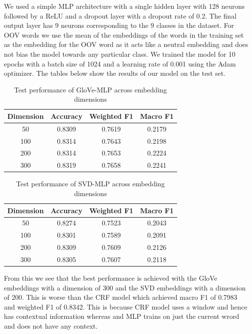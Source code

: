 \documentclass{report}
\begin{document}
We used a simple MLP architecture with a single hidden layer with 128 neurons followed by a ReLU and a dropout layer with a dropout rate of 0.2. The final output layer has 9 neurons corresponding to the 9 classes in the dataset. For OOV words we use the mean of the embeddings of the words in the training set as the embedding for the OOV word as it acts like a neutral embedding and does not bias the model towards any particular class. We trained the model for 10 epochs with a batch size of 1024 and a learning rate of 0.001 using the Adam optimizer. The tables below show the results of our model on the test set. 

\begin{table}[h]
\centering
\begin{tabular}{cccc}
\hline
Dimension & Accuracy & Weighted F1 & Macro F1 \\
\hline
50  & 0.8309 & 0.7619 & 0.2179 \\
100 & 0.8314 & 0.7643 & 0.2198 \\
200 & 0.8314 & 0.7653 & 0.2224 \\
300 & 0.8319 & 0.7658 & 0.2241 \\
\hline
\end{tabular}
\caption{Test performance of GloVe-MLP across embedding dimensions}
\end{table}

\begin{table}[h]
\centering
\begin{tabular}{cccc}
\hline
Dimension & Accuracy & Weighted F1 & Macro F1 \\
\hline
50  & 0.8274 & 0.7523 & 0.2043 \\
100 & 0.8301 & 0.7589 & 0.2091 \\
200 & 0.8309 & 0.7609 & 0.2126 \\
300 & 0.8305 & 0.7607 & 0.2118 \\
\hline
\end{tabular}
\caption{Test performance of SVD-MLP across embedding dimensions}
\end{table}

From this we see that the best performance is achieved with the GloVe embeddings with a dimension of 300 and the SVD embeddings with a dimension of 200. This is worse than the CRF model which achieved macro F1 of 0.7983 and weighted F1 of 0.8342. This is because CRF model uses a window and hence has contextual information whereas and MLP trains on just the current wrord and does not have any context.
\end{document}
